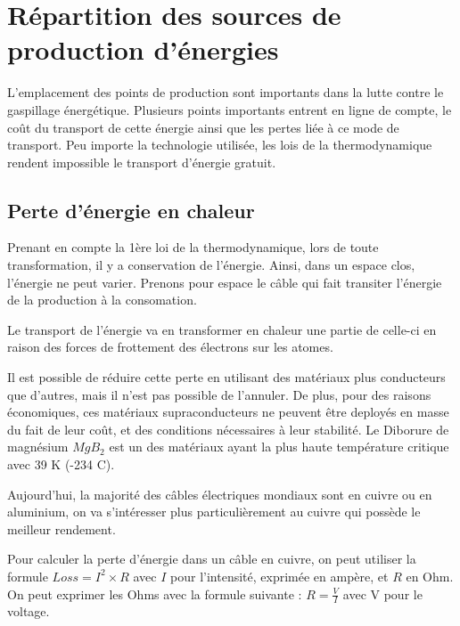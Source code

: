 \chapter{Répartition des sources de production d'énergies}

L'emplacement des points de production sont importants dans la lutte contre le gaspillage énergétique.
Plusieurs points importants entrent en ligne de compte, le coût du transport de cette énergie ainsi que les pertes liée à ce mode de transport.
Peu importe la technologie utilisée, les lois de la thermodynamique rendent impossible le transport d'énergie gratuit.

\section{Perte d'énergie en chaleur}

Prenant en compte la 1ère loi de la thermodynamique, lors de toute transformation, il y a conservation de l'énergie.
Ainsi, dans un espace clos, l'énergie ne peut varier.
Prenons pour espace le câble qui fait transiter l'énergie de la production à la consomation.

Le transport de l'énergie va en transformer en chaleur une partie de celle-ci en raison des forces de frottement des électrons sur les atomes.

Il est possible de réduire cette perte en utilisant des matériaux plus conducteurs que d'autres, mais il n'est pas possible de l'annuler.
De plus, pour des raisons économiques, ces matériaux supraconducteurs ne peuvent être deployés en masse du fait de leur coût, et des conditions nécessaires à leur stabilité.
Le Diborure de magnésium $MgB_2$ est un des matériaux ayant la plus haute température critique avec 39 K (-234 C).

Aujourd'hui, la majorité des câbles électriques mondiaux sont en cuivre ou en aluminium, on va s'intéresser plus particulièrement au cuivre qui possède le meilleur rendement.

Pour calculer la perte d'énergie dans un câble en cuivre, on peut utiliser la formule $Loss = I^2\times R$ avec $I$ pour l'intensité, exprimée en ampère, et $R$ en Ohm.
On peut exprimer les Ohms avec la formule suivante : $R = \frac{V}{I}$ avec V pour le voltage.

